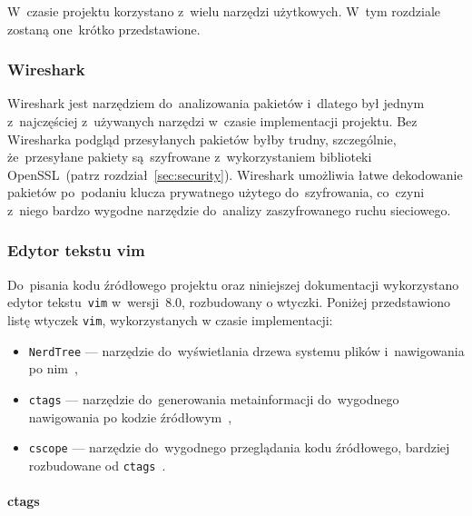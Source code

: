 \documentclass[thesis]{subfiles}
\begin{document}
W~czasie projektu korzystano z~wielu narzędzi użytkowych. W~tym rozdziale zostaną one~krótko przedstawione.


\subsubsection{Wireshark}

Wireshark jest narzędziem do~analizowania pakietów i~dlatego był jednym z~najczęściej z~używanych narzędzi w~czasie implementacji projektu. Bez Wiresharka podgląd przesyłanych pakietów byłby trudny, szczególnie, że~przesyłane pakiety są~szyfrowane z~wykorzystaniem biblioteki OpenSSL~(patrz rozdział~\ref{sec:security}). Wireshark umożliwia łatwe dekodowanie pakietów po~podaniu klucza prywatnego użytego do~szyfrowania, co~czyni z~niego bardzo wygodne narzędzie do~analizy zaszyfrowanego ruchu sieciowego.


\subsubsection{Edytor tekstu vim}

Do~pisania kodu źródłowego projektu oraz niniejszej dokumentacji wykorzystano edytor tekstu~\texttt{vim} w~wersji~8.0, rozbudowany o wtyczki. Poniżej przedstawiono listę wtyczek \texttt{vim}, wykorzystanych w czasie implementacji:
\begin{itemize}
	\item\texttt{NerdTree} --- narzędzie do~wyświetlania drzewa systemu plików i~nawigowania po nim~\cite{nerdtree-vimorg,nerdtree-github},
	\item\texttt{ctags} --- narzędzie do~generowania metainformacji do~wygodnego nawigowania po kodzie źródłowym~\cite{ctags},
	\item\texttt{cscope} --- narzędzie do~wygodnego przeglądania kodu źródłowego, bardziej rozbudowane od \texttt{ctags}~\cite{cscope}.
\end{itemize}



\paragraph{ctags}
\end{document}
